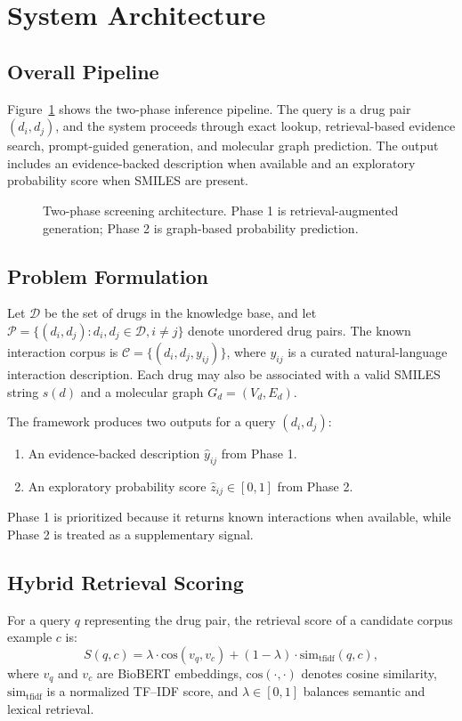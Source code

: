 \documentclass[conference]{IEEEtran}
\begin{document}
\section{System Architecture}
\subsection{Overall Pipeline}
Figure~\ref{fig:architecture} shows the two-phase inference pipeline. The query is a drug pair $(d_i, d_j)$, and the system proceeds through exact lookup, retrieval-based evidence search, prompt-guided generation, and molecular graph prediction. The output includes an evidence-backed description when available and an exploratory probability score when SMILES are present.

\begin{figure}[t]
    \centering
    \caption{Two-phase screening architecture. Phase 1 is retrieval-augmented generation; Phase 2 is graph-based probability prediction.}
    \label{fig:architecture}
\end{figure}

\subsection{Problem Formulation}
Let $\mathcal{D}$ be the set of drugs in the knowledge base, and let $\mathcal{P} = \{(d_i, d_j) : d_i, d_j \in \mathcal{D}, i \neq j\}$ denote unordered drug pairs. The known interaction corpus is $\mathcal{C} = \{(d_i, d_j, y_{ij})\}$, where $y_{ij}$ is a curated natural-language interaction description. Each drug may also be associated with a valid SMILES string $s(d)$ and a molecular graph $G_d = (V_d, E_d)$.

The framework produces two outputs for a query $(d_i, d_j)$:
\begin{enumerate}
    \item An evidence-backed description $\hat{y}_{ij}$ from Phase 1.
    \item An exploratory probability score $\hat{z}_{ij} \in [0,1]$ from Phase 2.
\end{enumerate}

Phase 1 is prioritized because it returns known interactions when available, while Phase 2 is treated as a supplementary signal.

\subsection{Hybrid Retrieval Scoring}
For a query $q$ representing the drug pair, the retrieval score of a candidate corpus example $c$ is:
\begin{equation}
    S(q,c) = \lambda \cdot \mathrm{cos}(v_q, v_c) + (1-\lambda) \cdot \mathrm{sim}_{\text{tfidf}}(q,c),
\end{equation}
where $v_q$ and $v_c$ are BioBERT embeddings, $\mathrm{cos}(\cdot,\cdot)$ denotes cosine similarity, $\mathrm{sim}_{\text{tfidf}}$ is a normalized TF--IDF score, and $\lambda \in [0,1]$ balances semantic and lexical retrieval.
\end{document}
